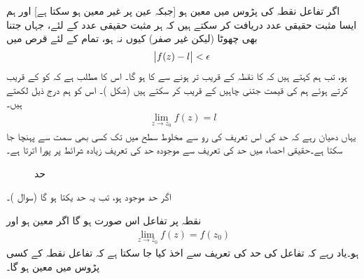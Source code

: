 اگر تفاعل  نقطہ  کی پڑوس میں معین ہو [جبکہ عین  پر  غیر معین ہو سکتا ہے] اور ہم ایسا مثبت حقیقی عدد  دریافت کر سکتے ہیں کہ ہر مثبت حقیقی  عدد  کے لئے، جہاں  جتنا بھی چھوٹا (لیکن غیر صفر) کیوں نہ ہو، تمام  کے لئے قرص  میں 
 \begin{align}\label{مساوات_مخلوط_حد_تعریف_الف}
\abs{f(z)-l}<\epsilon
\end{align}
ہو، تب ہم کہتے ہیں کہ  کا  نقطہ  کے قریب تر ہونے سے  کا   ہو گا۔ اس کا مطلب ہے کہ  کو  کے  قریب کرتے ہوئے ہم   کی قیمت  جتنی چاہیں   کے قریب کر سکتے ہیں (شکل )۔ اس کو ہم درج ذیل لکھتے ہیں۔
\begin{align}\label{مساوات_مخلوط_حد_تعریف_ب}
\lim_{z\to z_0} f(z)=l
\end{align}
یہاں دھیان رہے کہ حد کی اس تعریف کی رو سے  مخلوط سطح میں  تک کسی بھی سمت سے پہنچا جا سکتا ہے۔حقیقی احصاء میں حد کی تعریف سے موجودہ حد کی تعریف زیادہ شرائط پر پورا اترتا  ہے۔
%
\begin{figure}
\centering
{}
\caption{حد}
\label{شکل_مخلوط_حد_تعریف}
\end{figure}

اگر حد موجود ہو، تب یہ حد یکتا ہو گا (سوال )۔

نقطہ  پر تفاعل  اس صورت  ہو گا اگر  معین ہو اور
\begin{align}
\lim_{z\to z_0}f(z)=f(z_0)
\end{align}
ہو۔یاد رہے کہ تفاعل کی حد کی تعریف سے اخذ کیا جا سکتا ہے کہ تفاعل  نقطہ  کے کسی  پڑوس میں معین ہو گا۔

